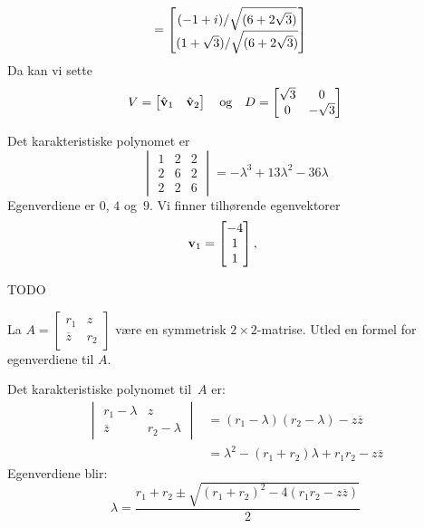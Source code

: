 \begin{losning}
\begin{punkt}
\begin{align*}
&= \begin{bmatrix} (-1+i)/\sqrt{(6+2\sqrt{3})} \\ (1+\sqrt{3})/\sqrt{(6+2\sqrt{3})} \end{bmatrix}
\end{align*}
Da kan vi sette
\[
V = \begin{bmatrix} \hat{\mathbf{v}}_1 & \hat{\mathbf{v}}_2 \end{bmatrix}
\quad\text{og}\quad
D =
\begin{bmatrix}
\sqrt{3} & 0         \\
0        & -\sqrt{3}
\end{bmatrix}
\]
\end{punkt}
\begin{punkt}
Det karakteristiske polynomet er
\[
\begin{vmatrix}
1 & 2 & 2\\
2 & 6 & 2\\
2 & 2 & 6
\end{vmatrix}
= -\lambda^3 + 13\lambda^2 - 36\lambda
\]
Egenverdiene er $0$, $4$ og~$9$.  Vi finner tilhørende egenvektorer
\[
\mathbf{v}_1 = \begin{bmatrix} -4 \\ 1 \\ 1 \end{bmatrix},\qquad
\]

TODO
\end{punkt}
\end{losning}


\begin{oppgave}
La $A=\begin{bmatrix}
r_1 & z\\
\overline{z} & r_2
\end{bmatrix}$ være en symmetrisk $2 \times 2$-matrise. Utled en formel for egenverdiene til $A$.
\end{oppgave}


\begin{losning}
Det karakteristiske polynomet til~$A$ er:
\begin{align*}
\begin{vmatrix}
r_1 - \lambda & z             \\
\overline{z}  & r_2 - \lambda
\end{vmatrix}
&= (r_1 - \lambda)(r_2 - \lambda) - z \overline{z} \\
&= \lambda^2 - (r_1 + r_2) \lambda + r_1 r_2 - z \overline{z}
\end{align*}
Egenverdiene blir:
\[
\lambda = \frac{r_1 + r_2 \pm \sqrt{(r_1 + r_2)^2 - 4 (r_1 r_2 - z \overline{z})}}{2}
\]
\end{losning}


